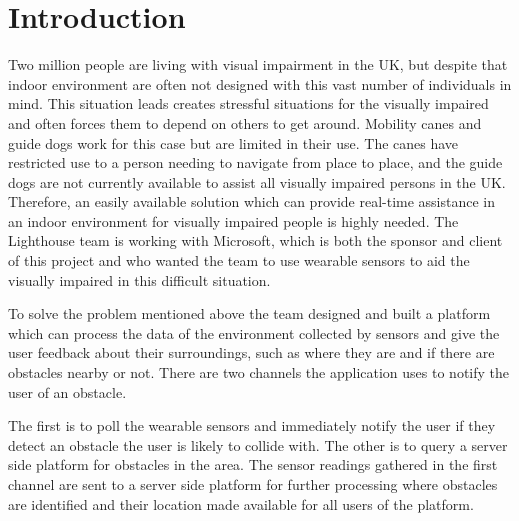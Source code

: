 \documentclass[prodmode,acmtosem]{acmsmall} %
\begin{document}



\maketitle

\section{Introduction}

Two million people are living with visual impairment in the UK, but despite that indoor environment are often not designed with this vast number of individuals in mind.\cite{NHSBlindStatistics} This situation leads creates stressful situations for the visually impaired and often forces them to depend on others to get around. Mobility canes and guide dogs work for this case but are limited in their use. The canes have restricted use to a person needing to navigate from place to place, and the guide dogs are not currently available to assist all visually impaired persons in the UK. Therefore, an easily available solution which can provide real-time assistance in an indoor environment for visually impaired people is highly needed. The Lighthouse team is working with Microsoft, which is both the sponsor and client of this project and who wanted the team to use wearable sensors to aid the visually impaired in this difficult situation.

To solve the problem mentioned above the team designed and built a platform which can process the data of the environment collected by sensors and give the user feedback about their surroundings, such as where they are and if there are obstacles nearby or not. There are two channels the application uses to notify the user of an obstacle.

The first is to poll the wearable sensors and immediately notify the user if they detect an obstacle the user is likely to collide with. The other is to query a server side platform for obstacles in the area. The sensor readings gathered in the first channel are sent to a server side platform for further processing where obstacles are identified and their location made available for all users of the platform. 
\end{document}
